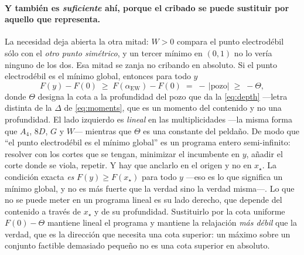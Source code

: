 \documentclass[11pt,a4paper]{article}
\begin{document}
\paragraph{Y también es \emph{suficiente} ahí, porque el cribado se puede sustituir por aquello que
representa.} La necesidad deja abierta la otra mitad: $W>0$ compara el punto electrodébil sólo con
el \emph{otro punto simétrico}, y un tercer mínimo en $(0,1)$ no lo vería ninguno de los dos. Esa
mitad se zanja no cribando en absoluto. Si el punto electrodébil es el mínimo global, entonces para
todo $y$
\begin{equation}\label{eq:semiinf}
  F(y)-F(0)\;\ge\;F(\alpha_{\text{EW}})-F(0)\;=\;-\,\bigl|\text{pozo}\bigr|\;\ge\;-\Theta ,
\end{equation}
donde $\Theta$ designa la cota a la profundidad del pozo que da la \eqref{eq:depth} ---letra
distinta de la $\Delta$ de \eqref{eq:moments}, que es un momento del contenido y no una
profundidad. El lado izquierdo es \emph{lineal} en las multiplicidades ---la misma forma que $A_4$,
$8D$, $G$ y $W$--- mientras que $\Theta$ es una constante del peldaño. De modo que
``el punto electrodébil es el mínimo global'' es un programa entero semi-infinito: resolver con los
cortes que se tengan, minimizar el incumbente en $y$, añadir el corte donde se viola, repetir. Y hay
que anclarlo en el origen y no en $x_\star$. La condición exacta \emph{es} $F(y)\ge F(x_\star)$
para todo $y$ ---eso es lo que significa un mínimo global, y no es más fuerte que la verdad sino la
verdad misma---. Lo que no se puede meter en un programa lineal es su lado derecho, que depende del
contenido a través de $x_\star$ y de su profundidad. Sustituirlo por la cota uniforme $F(0)-\Theta$
mantiene lineal el programa y mantiene la relajación \emph{más débil} que la verdad, que es la
dirección que necesita una cota superior: un máximo sobre un conjunto factible demasiado pequeño no
es una cota superior en absoluto.
\end{document}
